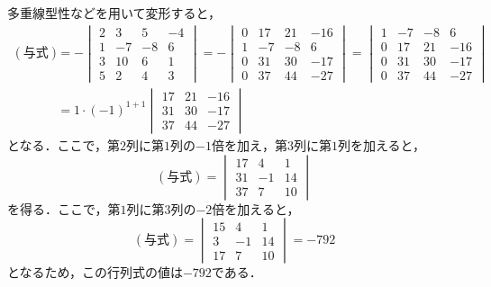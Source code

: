 \documentclass[uplatex,dvipdfmx,a4paper,10pt,fleqn]{jsarticle}
\begin{document}
    \begin{tleftbar}
        多重線型性などを用いて変形すると，
        \begin{align*} 
            (\text{与式}) & = -
            \begin{vmatrix} 
                2 & 3 & 5 & -4 \\
                1 & -7 & -8 & 6 \\
                3 & 10 & 6 & 1\\
                5 & 2 & 4 & 3 
            \end{vmatrix} 
            = - 
            \begin{vmatrix} 
                0 & 17 & 21 & -16 \\
                1 & -7 & -8 & 6 \\
                0 & 31 & 30 & -17 \\
                0 & 37 & 44 & -27 
            \end{vmatrix} 
            = 
            \begin{vmatrix} 
                1 & -7 & -8 & 6 \\
                0 & 17 & 21 & -16 \\
                0 & 31 & 30 & -17 \\
                0 & 37 & 44 & -27 
            \end{vmatrix}
            \\
            & = 1 \cdot (-1)^{1+1} 
            \begin{vmatrix} 
                17 & 21 & -16 \\
                31 & 30 & -17 \\
                37 & 44 & -27 
            \end{vmatrix}
        \end{align*} 
        となる．ここで，第$2$列に第$1$列の$-1$倍を加え，第$3$列に第$1$列を加えると，
        \[
            (\text{与式}) =
             \begin{vmatrix} 
                17 & 4 & 1\\
                31 & -1 & 14 \\
                37 & 7 & 10 
             \end{vmatrix}
        \]
        を得る．ここで，第$1$列に第$3$列の$-2$倍を加えると，
        \[
            (\text{与式})= 
            \begin{vmatrix} 
                15 & 4 & 1\\
                3 & -1 & 14 \\
                17 & 7 & 10 
            \end{vmatrix} 
            = -792 
        \]
        となるため，この行列式の値は$-792$である．
        \end{tleftbar}
\end{document}
